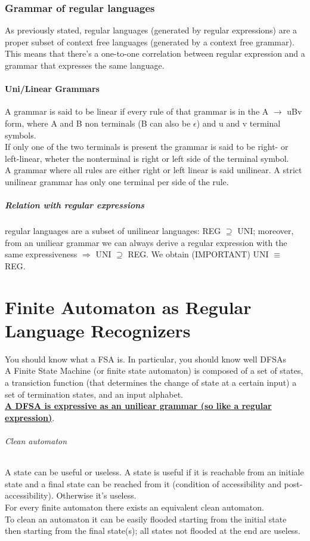 \documentclass[10pt,a4paper]{article}
\begin{document}
		\section{Grammar of regular languages}
			As previously stated, regular languages (generated by regular expressions) are a proper subset of context free languages (generated by a context free grammar). This means that there's a one-to-one correlation between regular expression and a grammar that expresses the same language. 
			\subsection{Uni/Linear Grammars}
				A grammar is said to be linear if every rule of that grammar is in the A $\rightarrow$ uBv form, where A and B non terminals (B can also be $\epsilon$) and u and v terminal symbols.\\
				If only one of the two terminals is present the grammar is said to be right- or left-linear, wheter the nonterminal is right or left side of the terminal symbol.\\
				A grammar where all rules are either right or left linear is said unilinear. A strict unilinear grammar has only one terminal per side of the rule.\\
				\subsubsection{Relation with regular expressions} regular languages are a subset of unilinear languages: REG $\supseteq$ UNI; moreover, from an uniliear grammar we can always derive a regular expression with the same expressiveness $\Rightarrow$ UNI $\supseteq$ REG. We obtain (IMPORTANT) UNI $\equiv$ REG.
	
	\clearpage	
	\part{Finite Automaton as Regular Language Recognizers}
		You should know what a FSA is. In particular, you should know well DFSAs\\
		A Finite State Machine (or finite state automaton) is composed of a set of states, a transiction function (that determines the change of state at a certain input) a set of termination states, and an input alphabet.\\
		\textbf{\underline{A DFSA is expressive as an uniliear grammar (so like a regular expression)}}.\\
		\paragraph{Clean automaton}
			A state can be useful or useless. A state is useful if it is reachable from an initiale state and a final state can be reached from it (condition of accessibility and post-accessibility). Otherwise it's useless.\\
			For every finite automaton there exists an equivalent clean automaton.\\
			To clean an automaton it can be easily flooded starting from the initial state then starting from the final state(s); all states not flooded at the end are useless.
\end{document}
